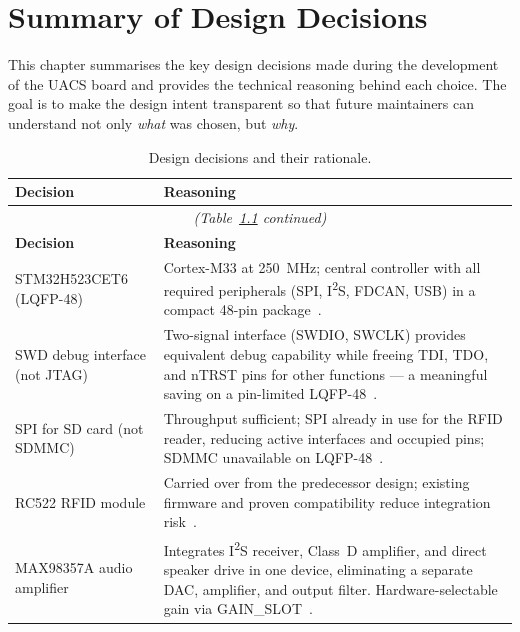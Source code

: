 \chapter{Summary of Design Decisions}
\label{kap:decisions}

This chapter summarises the key design decisions made during the development of the UACS
board and provides the technical reasoning behind each choice. The goal is to make the
design intent transparent so that future maintainers can understand not only \emph{what}
was chosen, but \emph{why}.

\begin{longtable}{p{} p{}}
  \caption{Design decisions and their rationale.}
  \label{tab:decisions} \\
  \toprule
  \textbf{Decision} & \textbf{Reasoning} \\
  \midrule
  \endfirsthead

  \multicolumn{2}{c}{\textit{(Table~\ref{tab:decisions} continued)}} \\
  \toprule
  \textbf{Decision} & \textbf{Reasoning} \\
  \midrule
  \endhead

  \bottomrule
  \endlastfoot

  STM32H523CET6 (LQFP-48)
    & Cortex-M33 at \SI{250}{\mega\hertz}; central controller with
      all required peripherals (SPI, I\textsuperscript{2}S, FDCAN, USB)
      in a compact 48-pin package~\cite{ref1}. \\[4pt]

  SWD debug interface (not JTAG)
    & Two-signal interface (SWDIO, SWCLK) provides equivalent debug
      capability while freeing TDI, TDO, and nTRST pins for other
      functions --- a meaningful saving on a pin-limited
      LQFP-48~\cite{ref12,ref13}. \\[4pt]

  SPI for SD card (not SDMMC)
    & Throughput sufficient; SPI already in use for the RFID reader,
      reducing active interfaces and occupied pins; SDMMC unavailable
      on LQFP-48~\cite{ref1}. \\[4pt]

  RC522 RFID module
    & Carried over from the predecessor design; existing firmware and
      proven compatibility reduce integration risk~\cite{ref3}. \\[4pt]

  MAX98357A audio amplifier
    & Integrates I\textsuperscript{2}S receiver, Class~D amplifier, and
      direct speaker drive in one device, eliminating a separate DAC,
      amplifier, and output filter. Hardware-selectable gain via
      GAIN\_SLOT~\cite{ref6}. \\[4pt]


\end{longtable}
